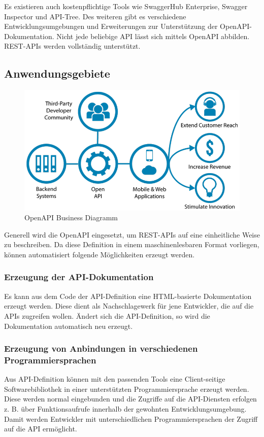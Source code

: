 Es existieren auch kostenpflichtige Tools wie SwaggerHub Enterprise, Swagger Inspector und API-Tree. 
Des weiteren gibt es verschiedene Entwicklungsumgebungen und Erweiterungen zur Unterstützung der OpenAPI-Dokumentation. 
Nicht jede beliebige API lässt sich mittels OpenAPI abbilden. REST-APIs werden vollständig unterstützt.

\subsection{Anwendungsgebiete}
\begin{figure}[h]
    \begin{center}
        \includegraphics*[width=14cm]{./pics/Open-APIs-v5.png}
        \caption[OpenAPI Business Diagramm]{OpenAPI Business Diagramm \cite{OpenAPIBusinessChart}}
    \end{center}
\end{figure}

Generell wird die OpenAPI eingesetzt, um REST-APIs auf eine einheitliche Weise zu beschreiben. Da diese Definition in einem 
maschinenlesbaren Format vorliegen, können automatisiert folgende Möglichkeiten erzeugt werden.

\subsubsection{Erzeugung der API-Dokumentation}
Es kann aus dem Code der API-Definition eine HTML-basierte Dokumentation erzeugt werden. Diese dient als Nachschlagewerk für jene Entwickler, 
die auf die APIs zugreifen wollen. Ändert sich die API-Definition, so wird die Dokumentation automatisch neu erzeugt.

\subsubsection{Erzeugung von Anbindungen in verschiedenen Programmiersprachen}
Aus API-Definition können mit den passenden Tools eine Client-seitige Softwarebibliothek in einer unterstützten Programmiersprache 
erzeugt werden. Diese werden normal eingebunden und die Zugriffe auf die API-Diensten erfolgen z. B. über Funktionsaufrufe innerhalb 
der gewohnten Entwicklungsumgebung. Damit werden Entwickler mit unterschiedlichen Programmiersprachen der Zugriff auf die API ermöglicht.

